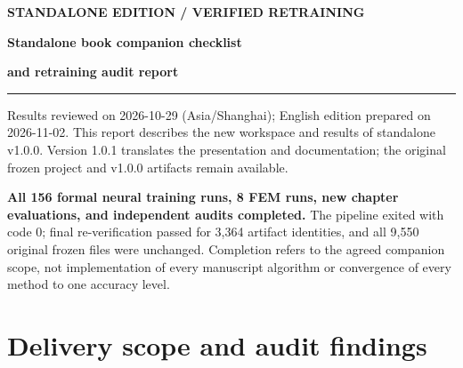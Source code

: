 \documentclass[a4paper,10pt]{article}
\begin{document}
{\small\bfseries\color{Link}STANDALONE EDITION / VERIFIED RETRAINING}\par

{\LARGE\bfseries\color{Navy}Standalone book companion checklist}\par

{\LARGE\bfseries\color{Navy}and retraining audit report}\par

\vspace{5pt}\textcolor{Navy}{\rule{\linewidth}{0.7pt}}\par

Results reviewed on 2026-10-29 (Asia/Shanghai); English edition prepared on 2026-11-02. This report describes the new workspace and results of standalone v1.0.0. Version 1.0.1 translates the presentation and documentation; the original frozen project and v1.0.0 artifacts remain available.

\textbf{All 156 formal neural training runs, 8 FEM runs, new chapter evaluations, and independent audits completed.} The pipeline exited with code 0; final re-verification passed for 3,364 artifact identities, and all 9,550 original frozen files were unchanged. Completion refers to the agreed companion scope, not implementation of every manuscript algorithm or convergence of every method to one accuracy level.

\section{Delivery scope and audit findings}
\end{document}
